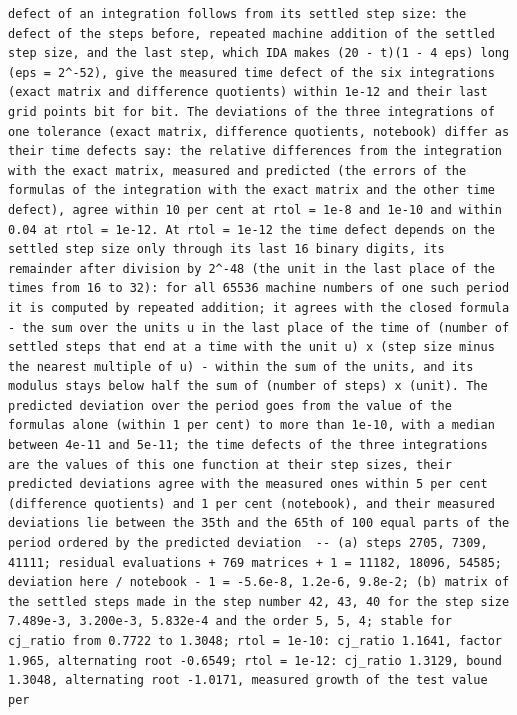 \documentclass[
  10pt,
]{article}
\begin{document}
\begin{verbatim}
defect of an integration follows from its settled step size: the defect of the steps before, repeated machine addition of the settled step size, and the last step, which IDA makes (20 - t)(1 - 4 eps) long (eps = 2^-52), give the measured time defect of the six integrations (exact matrix and difference quotients) within 1e-12 and their last grid points bit for bit. The deviations of the three integrations of one tolerance (exact matrix, difference quotients, notebook) differ as their time defects say: the relative differences from the integration with the exact matrix, measured and predicted (the errors of the formulas of the integration with the exact matrix and the other time defect), agree within 10 per cent at rtol = 1e-8 and 1e-10 and within 0.04 at rtol = 1e-12. At rtol = 1e-12 the time defect depends on the settled step size only through its last 16 binary digits, its remainder after division by 2^-48 (the unit in the last place of the times from 16 to 32): for all 65536 machine numbers of one such period it is computed by repeated addition; it agrees with the closed formula - the sum over the units u in the last place of the time of (number of settled steps that end at a time with the unit u) x (step size minus the nearest multiple of u) - within the sum of the units, and its modulus stays below half the sum of (number of steps) x (unit). The predicted deviation over the period goes from the value of the formulas alone (within 1 per cent) to more than 1e-10, with a median between 4e-11 and 5e-11; the time defects of the three integrations are the values of this one function at their step sizes, their predicted deviations agree with the measured ones within 5 per cent (difference quotients) and 1 per cent (notebook), and their measured deviations lie between the 35th and the 65th of 100 equal parts of the period ordered by the predicted deviation  -- (a) steps 2705, 7309, 41111; residual evaluations + 769 matrices + 1 = 11182, 18096, 54585; deviation here / notebook - 1 = -5.6e-8, 1.2e-6, 9.8e-2; (b) matrix of the settled steps made in the step number 42, 43, 40 for the step size 7.489e-3, 3.200e-3, 5.832e-4 and the order 5, 5, 4; stable for cj_ratio from 0.7722 to 1.3048; rtol = 1e-10: cj_ratio 1.1641, factor 1.965, alternating root -0.6549; rtol = 1e-12: cj_ratio 1.3129, bound 1.3048, alternating root -1.0171, measured growth of the test value per

\end{verbatim}
\end{document}
